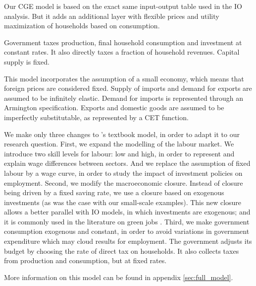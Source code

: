 Our CGE model is based on the exact same input-output table used in the IO analysis. But it adds an additional layer with flexible prices and utility maximization of households based on consumption.

Government taxes production, final household consumption and investment at constant rates.  It also directly taxes a fraction of household revenues. Capital supply is fixed. 

This model incorporates the assumption of a small economy, which means that foreign prices are considered fixed. Supply of imports and demand for exports are assumed to be infinitely elastic.
Demand for imports is represented through an Armington specification. Exports and domestic goods are assumed to be imperfectly substitutable, as represented by a CET function.

We make only three changes to \citet{Hosoe2010}'s textbook model, in order to adapt it to our research question. 
First, we expand the modelling of the labour market. We introduce two skill levels for labour: low and high, in order to represent and explain wage differences between sectors. And we replace the assumption of fixed labour by a wage curve, in order to study the impact of investment policies on employment.
Second, we modify the macroeconomic closure. Instead of closure being driven by a fixed saving rate, we use a closure based on exogenous investments (as was the case with our small-scale examples). This new closure allows a better parallel with IO models, in which investments are exogenous; and it is commonly used in the literature on green jobs \citep{Lehr2008,Lehr2012}.
Third, we make government consumption exogenous and constant, in order to avoid variations in government expenditure which may cloud results for employment. The government adjusts its budget by choosing the rate of direct tax on households. It also collects taxes from production and consumption, but at fixed rates.

More information on this model can be found in appendix \ref{sec:full_model}.

